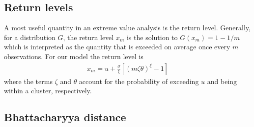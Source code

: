 % 
% 

\subsection{Return levels}
\label{return}

A most useful quantity in an extreme value analysis is the return level. Generally, for a distribution $G$, the return level $x_m$ is the solution to
$ G(x_m) = 1-1/m$ which is interpreted as
the quantity that is exceeded on average once every $m$ observations.
For our model the return level is
\begin{align}
x_m = u +\frac{\sigma}{\xi}\left[\left(m\zeta\theta\right)^\xi-1\right] \label{rl}
\end{align}
where the terms $\zeta$ and $\theta$ account for the probability of exceeding $u$ and being within a cluster, respectively. 


\subsection{Bhattacharyya distance}
\label{bhatta}

